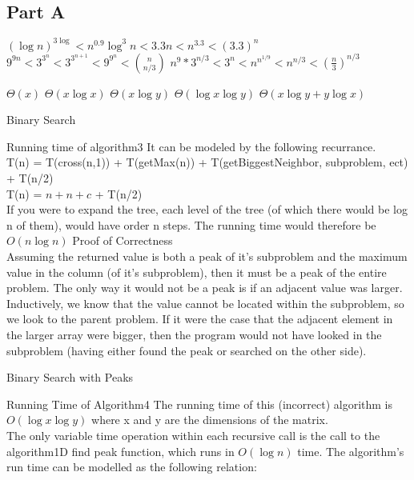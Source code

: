 \documentclass[12pt,twoside]{article}
\begin{document}
\begin{problems}
\section*{Part A}
\problem
\begin{problemparts}
\problempart $(\log n)^{3 \log } <  n^{0.9}\log^3n < 3.3n < n^{3.3}  < (3.3)^n$
\problempart $9^{9n} < 3^{3^n} < 3^{3^{n+1}}< 9^{9^n} < \binom{n}{n/3}$
\problempart $n^9*3^{n/3} < 3^n < n^{n^{1/9}} < n^{n/3} < \left(\frac{n}{3}\right)^{n/3}$
\end{problemparts}
\problem
\begin{problemparts}
\problempart $\Theta(x)$
\problempart $\Theta(x \log x)$
\problempart $\Theta(x \log y)$
\problempart $\Theta( \log x \log y )$
\problempart $\Theta(x\log y + y \log x)$
\end{problemparts}
\problem Binary Search
\begin{problemparts}
\problempart Running time of algorithm3
It can be modeled by the following recurrance.\\
T(n) = T(cross(n,1)) + T(getMax(n)) + T(getBiggestNeighbor, subproblem, ect) + T(n/2)\\
T(n) = $n + n + c$ + T(n/2)\\
If you were to expand the tree, each level of the tree (of which there would be log n of them), would have order n steps.  The running time would
therefore be $O(n \log n)$
\problempart Proof of Correctness\\
Assuming the returned value is both a peak of it's subproblem and the maximum value in the column (of it's subproblem), then it must be a peak 
of the entire problem.  The only way it would not be a peak is if an adjacent value was larger.  Inductively, we know that the value cannot be
located within the subproblem, so we look to the parent problem.  If it were the case that the adjacent element in the larger array were bigger,
then the program would not have looked in the subproblem (having either found the peak or searched on the other side).
\end{problemparts}
\problem Binary Search with Peaks
\begin{problemparts}
\problempart Running Time of Algorithm4
The running time of this (incorrect) algorithm is $O(\log x \log y)$ where x and y are the dimensions of the matrix. \\
The only variable time operation within each recursive call is the call to the algorithm1D find peak function, which runs in $O(\log n)$ time.  The algorithm's run time can be modelled as the following relation: \\

\end{problemparts}
\end{problems}
\end{document}
